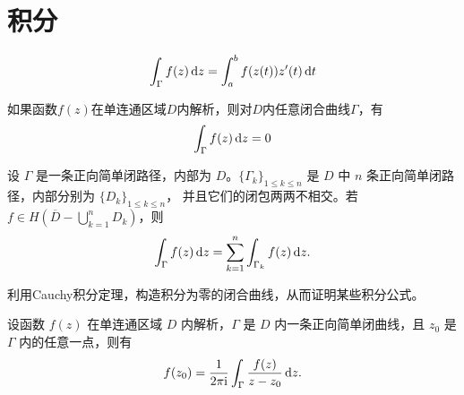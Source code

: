 \chapter{积分}
\[
    \int_{\Gamma} f(z) \d{z} = \int_{a}^{b} f(z(t)) z'(t) \d{t}
\]
\begin{theorem}[Cauchy积分定理]
    如果函数\(f(z)\)在单连通区域\(D\)内解析，则对\(D\)内任意闭合曲线\(\Gamma\)，有
    \[
        \int_{\Gamma} f(z) \d{z} = 0
    \]
\end{theorem}

\begin{theorem}
    设 \(\Gamma\) 是一条正向简单闭路径，内部为 \(D\)。\(\{\Gamma_k\}_{1 \le k \le
    n}\) 是 \(D\) 中 \(n\) 条正向简单闭路径，内部分别为 \(\{D_k\}_{1 \le k \le n}\)，
    并且它们的闭包两两不相交。若 \(f \in H\left(\overline{D} - \bigcup_{k=1}^n D_k\right)\)，则
    \[
        \int_{\Gamma} f(z) \d{z} = \sum_{k=1}^n \int_{\Gamma_k} f(z) \d{z}.
    \]
\end{theorem}

\begin{note}
    利用Cauchy积分定理，构造积分为零的闭合曲线，从而证明某些积分公式。
\end{note}

\begin{theorem}[Cauchy积分公式]
    设函数 \(f(z)\) 在单连通区域 \(D\) 内解析，\(\Gamma\) 是 \(D\) 内一条正向简单闭曲线，且
    \(z_0\) 是 \(\Gamma\) 内的任意一点，则有
    \[
        f(z_0) = \frac{1}{2\pi \i} \int_{\Gamma} \frac{f(z)}{z - z_0} \d{z}.
    \]
\end{theorem}